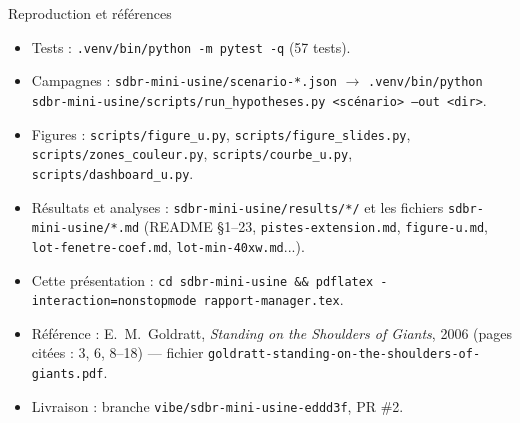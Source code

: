 \documentclass[10pt,aspectratio=169]{beamer}
\begin{document}
\begin{frame}{Reproduction et références}
\footnotesize
\begin{itemize}
  \item Tests : \texttt{.venv/bin/python -m pytest -q} (57 tests).
  \item Campagnes : \texttt{sdbr-mini-usine/scenario-*.json} $\rightarrow$
        \texttt{.venv/bin/python sdbr-mini-usine/scripts/run\_hypotheses.py <scénario> --out <dir>}.
  \item Figures : \texttt{scripts/figure\_u.py}, \texttt{scripts/figure\_slides.py},
        \texttt{scripts/zones\_couleur.py}, \texttt{scripts/courbe\_u.py}, \texttt{scripts/dashboard\_u.py}.
  \item Résultats et analyses : \texttt{sdbr-mini-usine/results/*/} et les fichiers
        \texttt{sdbr-mini-usine/*.md} (README \S 1--23, \texttt{pistes-extension.md},
        \texttt{figure-u.md}, \texttt{lot-fenetre-coef.md}, \texttt{lot-min-40xw.md}...).
  \item Cette présentation : \texttt{cd sdbr-mini-usine \&\& pdflatex -interaction=nonstopmode rapport-manager.tex}.
  \item Référence : E.~M.~Goldratt, \emph{Standing on the Shoulders of Giants}, 2006
        (pages citées : 3, 6, 8--18) --- fichier \texttt{goldratt-standing-on-the-shoulders-of-giants.pdf}.
  \item Livraison : branche \texttt{vibe/sdbr-mini-usine-eddd3f}, PR \#2.
\end{itemize}
\end{frame}
\end{document}
